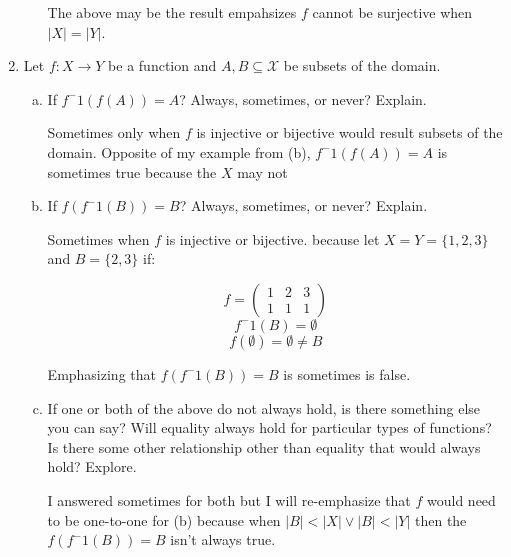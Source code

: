 \documentclass[11pt, a4paper]{article}
\newcommand\setItemNumber[1]{\setcounter{enumi}{\numexpr#1-1\relax}}
\begin{document}
\begin{enumerate}
\begin{enumerate}[(a)]
                The above may be the result empahsizes $f$ cannot be surjective when $|X| = |Y|$.

        \end{enumerate}

    \setItemNumber{28}
    \item Let $f: X\rightarrow Y$ be a function and $A,B\subseteq\mathcal{X}$ be subsets of the domain.
        \begin{enumerate}[(a)]
            \item If $f^-1(f(A)) = A$? Always, sometimes, or never? Explain.

                Sometimes only when $f$ is injective or bijective would result subsets of the domain. Opposite of my example from (b), $f^-1(f(A)) = A$ is sometimes true because the $X$ may not

            \item If $f(f^-1(B)) = B$? Always, sometimes, or never? Explain.

                Sometimes when $f$ is injective or bijective. because let $X = Y = \{1,2,3\}$ and $B = \{2,3\}$ if:

                $$ f = \begin{pmatrix} 1 & 2 & 3 \\ 1 & 1 & 1 \end{pmatrix}$$ 
                $$ f^-1(B) = \emptyset$$
                $$ f(\emptyset) = \emptyset \neq B$$

                Emphasizing that $f(f^-1(B)) = B$ is sometimes is false.

            \item If one or both of the above do not always hold, is there something else you can say? Will equality always hold for particular types of functions? Is there some other relationship other than equality that would always hold? Explore.  

                I answered sometimes for both but I will re-emphasize that $f$ would need to be one-to-one for (b) because when $|B| < |X| \lor |B| < |Y|$ then the $f(f^-1(B)) = B$ isn't always true.

            \end{enumerate} 

    \end{enumerate} 
                
\end{document}
